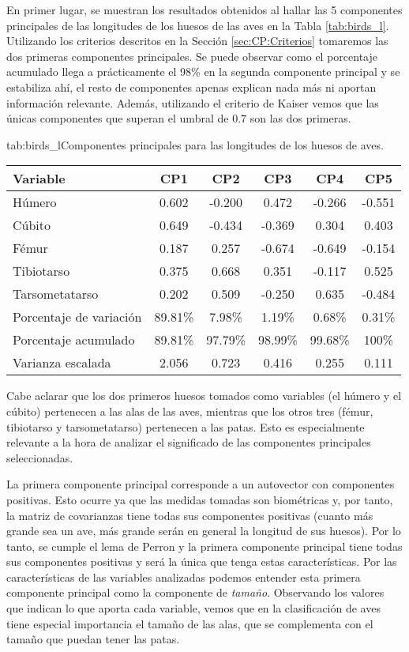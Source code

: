 \documentclass[tfg,cienciasbased,lot,lof,covers,final,overleaf,nocopyright]{tfgtfmthesisuam}
\begin{document}
En primer lugar, se muestran los resultados obtenidos al hallar las 5 componentes principales de las longitudes de los huesos de las aves en la Tabla \ref{tab:birds_l}. Utilizando los criterios descritos en la Sección \ref{sec:CP:Criterios} tomaremos las dos primeras componentes principales. Se puede observar como el porcentaje acumulado llega a prácticamente el 98\% en la segunda componente principal y se estabiliza ahí, el resto de componentes apenas explican nada más ni aportan información relevante. Además, utilizando el criterio de Kaiser vemos que las únicas componentes que superan el umbral de $0\mbox{.}7$ son las dos primeras.

\begin{table}{tab:birds_l}{Componentes principales para las longitudes de los huesos de aves.}
    \begin{tabular}{lccccc}
        \toprule \textbf{Variable} & \textbf{CP1} & \textbf{CP2} & \textbf{CP3} & \textbf{CP4} & \textbf{CP5}\\
        \midrule
        Húmero &  0.602 & -0.200 &  0.472 & -0.266 & -0.551\\
        Cúbito & 0.649 & -0.434 & -0.369 &  0.304 &  0.403\\
        Fémur &  0.187 &  0.257 & -0.674 & -0.649 & -0.154\\
        Tibiotarso & 0.375 &  0.668 &  0.351 & -0.117 &  0.525\\
        Tarsometatarso &  0.202 &  0.509 & -0.250 &  0.635 & -0.484\\
        \midrule Porcentaje de variación & 89.81\% &  7.98\% &  1.19\% & 0.68\% & 0.31\%\\
        Porcentaje acumulado & 89.81\% &  97.79\% &  98.99\% & 99.68\% & 100\%\\
        Varianza escalada & 2.056 & 0.723 & 0.416 & 0.255 & 0.111\\
        \bottomrule
    \end{tabular}
\end{table}

Cabe aclarar que los dos primeros huesos tomados como variables (el húmero y el cúbito) pertenecen a las alas de las aves, mientras que los otros tres (fémur, tibiotarso y tarsometatarso) pertenecen a las patas. Esto es especialmente relevante a la hora de analizar el significado de las componentes principales seleccionadas.


La primera componente principal corresponde a un autovector con componentes positivas. Esto ocurre ya que las medidas tomadas son biométricas y, por tanto, la matriz de covarianzas tiene todas sus componentes positivas (cuanto más grande sea un ave, más grande serán en general la longitud de sus huesos). Por lo tanto, se cumple el lema de Perron y la primera componente principal tiene todas sus componentes positivas y será la única que tenga estas características. Por las características de las variables analizadas podemos entender esta primera componente principal como la componente de \textit{tamaño}. Observando los valores que indican lo que aporta cada variable, vemos que en la clasificación de aves tiene especial importancia el tamaño de las alas, que se complementa con el tamaño que puedan tener las patas.
\end{document}
